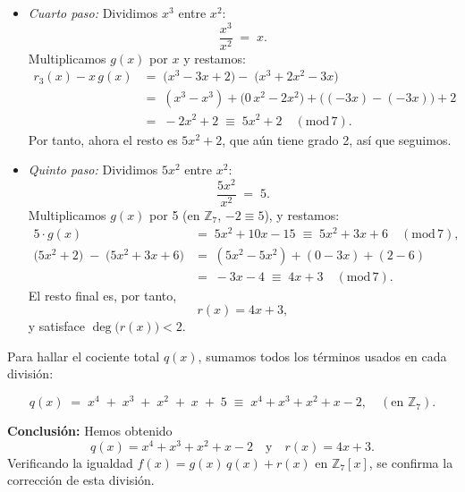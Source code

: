 \begin{itemize}
    \item \textit{Cuarto paso:} Dividimos $x^3$ entre $x^2$:
    \[
    \frac{x^3}{x^2} \;=\; x.
    \]
    Multiplicamos $g(x)$ por $x$ y restamos:
    \[
    \begin{aligned}
    r_3(x) - x\,g(x)
    &=\; \bigl(x^3 - 3x + 2\bigr)
    -\;\bigl(x^3 + 2x^2 - 3x\bigr) \\
    &=\; (x^3 - x^3) + \bigl(0\,x^2 - 2x^2\bigr) + \bigl((-3x)-(-3x)\bigr) + 2 \\
    &=\; -2x^2 + 2
    \;\equiv\; 5x^2 + 2
    \quad (\mathrm{mod}\,7).
    \end{aligned}
    \]
    Por tanto, ahora el resto es $5x^2 + 2$, que aún tiene grado 2, así que seguimos.

    \item \textit{Quinto paso:} Dividimos $5x^2$ entre $x^2$:
    \[
    \frac{5x^2}{x^2} \;=\; 5.
    \]
    Multiplicamos $g(x)$ por 5 (en $\mathbb{Z}_7$, $-2 \equiv 5$), y restamos:
    \[
    \begin{aligned}
    5 \cdot g(x)
    &=\; 5x^2 + 10x - 15
    \;\equiv\; 5x^2 + 3x + 6
    \quad (\mathrm{mod}\,7), \\
    \bigl(5x^2 + 2\bigr) \;-\; \bigl(5x^2 + 3x + 6\bigr)
    &=\; (5x^2-5x^2) + (0 - 3x) + (2 - 6) \\
    &=\; -3x - 4
    \;\equiv\; 4x + 3
    \quad (\mathrm{mod}\,7).
    \end{aligned}
    \]
    El resto final es, por tanto,
    \[
    r(x) = 4x + 3,
    \]
    y satisface $\deg\bigl(r(x)\bigr) < 2$.

\end{itemize}

Para hallar el cociente total $q(x)$, sumamos todos los términos usados en cada división:

\[
q(x) 
\;=\; x^4 \;+\; x^3 \;+\; x^2 \;+\; x \;+\; 5
\;\equiv\; x^4 + x^3 + x^2 + x - 2,
\quad (\text{en } \mathbb{Z}_7).
\]

\medskip
\noindent
\textbf{Conclusión:} Hemos obtenido
\[
\boxed{
q(x) = x^4 + x^3 + x^2 + x - 2
\quad\text{y}\quad
r(x) = 4x + 3.
}
\]
Verificando la igualdad $f(x) = g(x) \, q(x) + r(x)$ en $\mathbb{Z}_7[x]$, se confirma la corrección de esta división.




